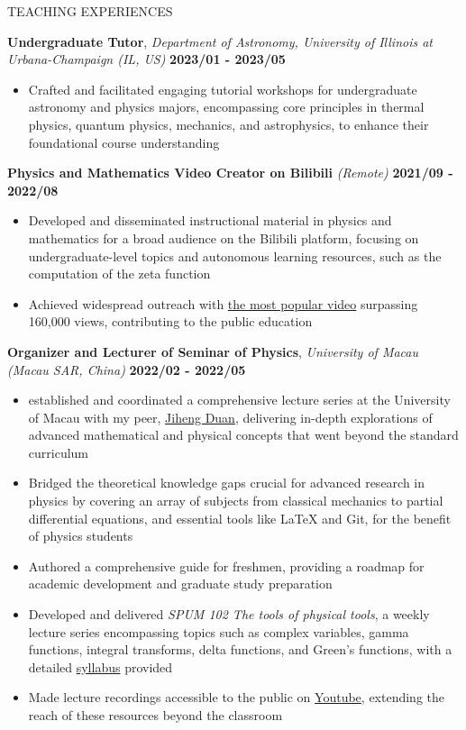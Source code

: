 \documentclass[10pt]{article} %
\begin{document}
\begin{section}{TEACHING EXPERIENCES}

\textbf{Undergraduate Tutor}, \textit{Department of Astronomy, University of Illinois at Urbana-Champaign (IL, US)} \hfill \textbf{2023/01 - 2023/05}
\begin{itemize}[leftmargin=1.5em]
    \item Crafted and facilitated engaging tutorial workshops for undergraduate astronomy and physics majors, encompassing core principles in thermal physics, quantum physics, mechanics, and astrophysics, to enhance their foundational course understanding
\end{itemize}

\textbf{Physics and Mathematics Video Creator on Bilibili} \textit{(Remote)} \hfill \textbf{2021/09 - 2022/08}
\begin{itemize}[leftmargin=1.5em]
    \item Developed and disseminated instructional material in physics and mathematics for a broad audience on the Bilibili platform, focusing on undergraduate-level topics and autonomous learning resources, such as the computation of the zeta function
    \item Achieved widespread outreach with \href{https://www.bilibili.com/video/BV1th411W7xu/}{the most popular video} surpassing 160,000 views, contributing to the public education
\end{itemize}

\textbf{Organizer and Lecturer of Seminar of Physics}, \textit{University of Macau (Macau SAR, China)} \hfill \textbf{2022/02 - 2022/05}
\begin{itemize}[leftmargin=1.5em]
    \item established and coordinated a comprehensive lecture series at the University of Macau with my peer, \href{http://runawayfancy.me/}{Jiheng Duan}, delivering in-depth explorations of advanced mathematical and physical concepts that went beyond the standard curriculum
    \item Bridged the theoretical knowledge gaps crucial for advanced research in physics by covering an array of subjects from classical mechanics to partial differential equations, and essential tools like LaTeX and Git, for the benefit of physics students
    \item Authored a comprehensive guide for freshmen, providing a roadmap for academic development and graduate study preparation
    \item Developed and delivered \textit{SPUM 102 The tools of physical tools}, a weekly lecture series encompassing topics such as complex variables, gamma functions, integral transforms, delta functions, and Green's functions, with a detailed \href{https://github.com/Chisen-Lupus/Seminar-of-Physics-UM/blob/main/SPUM%20102%20The%20tools%20of%20physical%20tool.pdf}{syllabus} provided
    \item Made lecture recordings accessible to the public on \href{https://www.youtube.com/watch?v=nQkv03r-XeQ&list=PLV9fHDZW7hHWQ9rrAk7c9kdeV-Lqyt7pV&index=10}{Youtube}, extending the reach of these resources beyond the classroom
\end{itemize}


\end{section}
\end{document}
